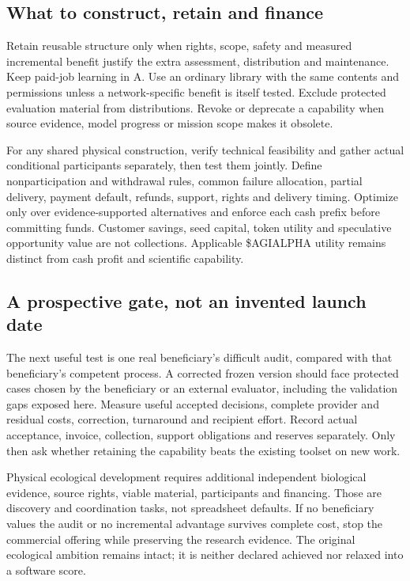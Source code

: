 \documentclass[11pt]{article}
\begin{document}
\subsection{What to construct, retain and finance}
Retain reusable structure only when rights, scope, safety and measured incremental benefit justify the extra assessment, distribution and maintenance. Keep paid-job learning in A. Use an ordinary library with the same contents and permissions unless a network-specific benefit is itself tested. Exclude protected evaluation material from distributions. Revoke or deprecate a capability when source evidence, model progress or mission scope makes it obsolete.

For any shared physical construction, verify technical feasibility and gather actual conditional participants separately, then test them jointly. Define nonparticipation and withdrawal rules, common failure allocation, partial delivery, payment default, refunds, support, rights and delivery timing. Optimize only over evidence-supported alternatives and enforce each cash prefix before committing funds. Customer savings, seed capital, token utility and speculative opportunity value are not collections. Applicable \$AGIALPHA utility remains distinct from cash profit and scientific capability.

\subsection{A prospective gate, not an invented launch date}
The next useful test is one real beneficiary's difficult audit, compared with that beneficiary's competent process. A corrected frozen version should face protected cases chosen by the beneficiary or an external evaluator, including the validation gaps exposed here. Measure useful accepted decisions, complete provider and residual costs, correction, turnaround and recipient effort. Record actual acceptance, invoice, collection, support obligations and reserves separately. Only then ask whether retaining the capability beats the existing toolset on new work.

Physical ecological development requires additional independent biological evidence, source rights, viable material, participants and financing. Those are discovery and coordination tasks, not spreadsheet defaults. If no beneficiary values the audit or no incremental advantage survives complete cost, stop the commercial offering while preserving the research evidence. The original ecological ambition remains intact; it is neither declared achieved nor relaxed into a software score.
\end{document}
